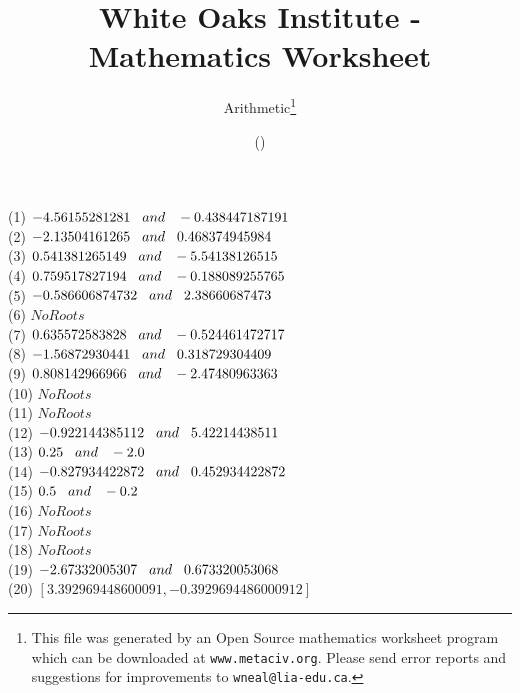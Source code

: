 \documentclass[letter]{article}
\begin{document}
\title{White Oaks Institute - Mathematics Worksheet}
\author{Arithmetic\thanks{This file was generated by an \textsf{Open Source} mathematics worksheet program which can be downloaded at \texttt{www.metaciv.org}. Please send error reports and suggestions for improvements to \texttt{wneal@lia-edu.ca}.}}
\date{\XCfileversion{} (\XCfiledate)}
\maketitle
\begin{multicols}{2}(1) $-4.56155281281\hspace{3 mm} and \hspace{3 mm} -0.438447187191$\\(2) $-2.13504161265\hspace{3 mm} and \hspace{3 mm} 0.468374945984$\\(3) $0.541381265149\hspace{3 mm} and \hspace{3 mm} -5.54138126515$\\(4) $0.759517827194\hspace{3 mm} and \hspace{3 mm} -0.188089255765$\\(5) $-0.586606874732\hspace{3 mm} and \hspace{3 mm} 2.38660687473$\\(6) $No Roots$\\(7) $0.635572583828\hspace{3 mm} and \hspace{3 mm} -0.524461472717$\\(8) $-1.56872930441\hspace{3 mm} and \hspace{3 mm} 0.318729304409$\\(9) $0.808142966966\hspace{3 mm} and \hspace{3 mm} -2.47480963363$\\(10) $No Roots$\\(11) $No Roots$\\(12) $-0.922144385112\hspace{3 mm} and \hspace{3 mm} 5.42214438511$\\(13) $0.25\hspace{3 mm} and \hspace{3 mm} -2.0$\\(14) $-0.827934422872\hspace{3 mm} and \hspace{3 mm} 0.452934422872$\\(15) $0.5\hspace{3 mm} and \hspace{3 mm} -0.2$\\(16) $No Roots$\\(17) $No Roots$\\(18) $No Roots$\\(19) $-2.67332005307\hspace{3 mm} and \hspace{3 mm} 0.673320053068$\\(20) $[3.392969448600091, -0.3929694486000912]$\end{multicols}
\end{document}
